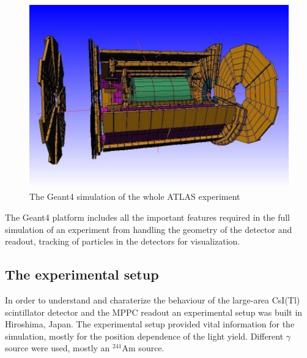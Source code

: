 \documentclass[12pt, a4paper,titlepage]{article}
\numberwithin{equation}{section}
\numberwithin{figure}{section}
\begin{document}
\begin{figure}[H]
\centering
\includegraphics[width=130.0mm]{images/AtlasHalf.jpg}
\caption{The Geant4 simulation of the whole ATLAS experiment}
\end{figure}

The Geant4 platform includes all the important features required in the full simulation of an experiment from handling the geometry of the detector and readout, tracking of particles in the detectors for visualization.

\subsection{The experimental setup}

In order to understand and charaterize the behaviour of the large-area CsI(Tl) scintillator detector and the MPPC readout an experimental setup was built in Hiroshima, Japan. The experimental setup provided vital information for the simulation, mostly for the position dependence of the light yield. Different $\gamma$ source were used, mostly an $^{241}$Am source. 
\end{document}
